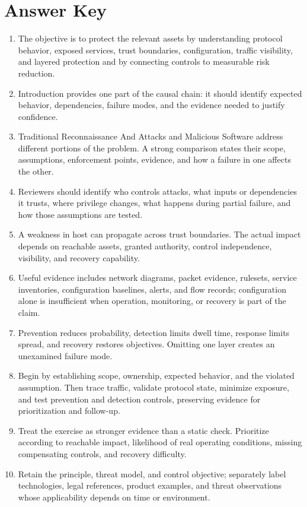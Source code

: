 \documentclass[11pt,letterpaper]{article}
\begin{document}
\section*{Answer Key}
\begin{enumerate}
\item The objective is to protect the relevant assets by understanding protocol behavior, exposed services, trust boundaries, configuration, traffic visibility, and layered protection and by connecting controls to measurable risk reduction.
\item Introduction provides one part of the causal chain: it should identify expected behavior, dependencies, failure modes, and the evidence needed to justify confidence.
\item Traditional Reconnaissance And Attacks and Malicious Software address different portions of the problem. A strong comparison states their scope, assumptions, enforcement points, evidence, and how a failure in one affects the other.
\item Reviewers should identify who controls attacks, what inputs or dependencies it trusts, where privilege changes, what happens during partial failure, and how those assumptions are tested.
\item A weakness in host can propagate across trust boundaries. The actual impact depends on reachable assets, granted authority, control independence, visibility, and recovery capability.
\item Useful evidence includes network diagrams, packet evidence, rulesets, service inventories, configuration baselines, alerts, and flow records; configuration alone is insufficient when operation, monitoring, or recovery is part of the claim.
\item Prevention reduces probability, detection limits dwell time, response limits spread, and recovery restores objectives. Omitting one layer creates an unexamined failure mode.
\item Begin by establishing scope, ownership, expected behavior, and the violated assumption. Then trace traffic, validate protocol state, minimize exposure, and test prevention and detection controls, preserving evidence for prioritization and follow-up.
\item Treat the exercise as stronger evidence than a static check. Prioritize according to reachable impact, likelihood of real operating conditions, missing compensating controls, and recovery difficulty.
\item Retain the principle, threat model, and control objective; separately label technologies, legal references, product examples, and threat observations whose applicability depends on time or environment.
\end{enumerate}
\end{document}
